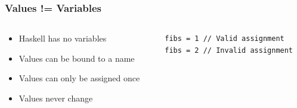 \documentclass{beamer}
\begin{document}
    \lstset{language=Haskell}
    \begin{frame}[fragile=singleslide]
        \frametitle{Values != Variables}

        \begin{columns}[c]
            \begin{column}[T]{5cm}
                \begin{itemize}
                    \item Haskell has no variables
                    \item Values can be bound to a name
                    \item Values can only be assigned once
                    \item Values never change
                \end{itemize}
            \end{column}
            \begin{column}[T]{5cm}
                \begin{lstlisting}
fibs = 1 // Valid assignment
fibs = 2 // Invalid assignment
                \end{lstlisting}
            \end{column}
        \end{columns}
    \end{frame}
\end{document}
